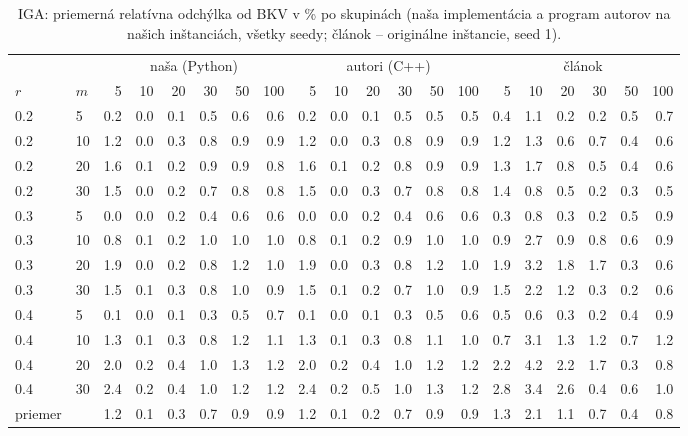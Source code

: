 \begin{table}[ht]
\centering
\scriptsize
\setlength{\tabcolsep}{3pt}
\caption{IGA: priemerná relatívna odchýlka od BKV v \% po skupinách (naša implementácia a program autorov na našich inštanciách, všetky seedy; článok – originálne inštancie, seed 1).}
\label{tab:rpd_iga}
\begin{tabular}{ll|rrrrrr|rrrrrr|rrrrrr}
\toprule
 &  & \multicolumn{6}{c}{naša (Python)} & \multicolumn{6}{c}{autori (C++)} & \multicolumn{6}{c}{článok} \\
$r$ & $m$ & 5 & 10 & 20 & 30 & 50 & 100 & 5 & 10 & 20 & 30 & 50 & 100 & 5 & 10 & 20 & 30 & 50 & 100 \\
\midrule
0.2 & 5 & 0.2 & 0.0 & 0.1 & 0.5 & 0.6 & 0.6 & 0.2 & 0.0 & 0.1 & 0.5 & 0.5 & 0.5 & 0.4 & 1.1 & 0.2 & 0.2 & 0.5 & 0.7 \\
0.2 & 10 & 1.2 & 0.0 & 0.3 & 0.8 & 0.9 & 0.9 & 1.2 & 0.0 & 0.3 & 0.8 & 0.9 & 0.9 & 1.2 & 1.3 & 0.6 & 0.7 & 0.4 & 0.6 \\
0.2 & 20 & 1.6 & 0.1 & 0.2 & 0.9 & 0.9 & 0.8 & 1.6 & 0.1 & 0.2 & 0.8 & 0.9 & 0.9 & 1.3 & 1.7 & 0.8 & 0.5 & 0.4 & 0.6 \\
0.2 & 30 & 1.5 & 0.0 & 0.2 & 0.7 & 0.8 & 0.8 & 1.5 & 0.0 & 0.3 & 0.7 & 0.8 & 0.8 & 1.4 & 0.8 & 0.5 & 0.2 & 0.3 & 0.5 \\
0.3 & 5 & 0.0 & 0.0 & 0.2 & 0.4 & 0.6 & 0.6 & 0.0 & 0.0 & 0.2 & 0.4 & 0.6 & 0.6 & 0.3 & 0.8 & 0.3 & 0.2 & 0.5 & 0.9 \\
0.3 & 10 & 0.8 & 0.1 & 0.2 & 1.0 & 1.0 & 1.0 & 0.8 & 0.1 & 0.2 & 0.9 & 1.0 & 1.0 & 0.9 & 2.7 & 0.9 & 0.8 & 0.6 & 0.9 \\
0.3 & 20 & 1.9 & 0.0 & 0.2 & 0.8 & 1.2 & 1.0 & 1.9 & 0.0 & 0.3 & 0.8 & 1.2 & 1.0 & 1.9 & 3.2 & 1.8 & 1.7 & 0.3 & 0.6 \\
0.3 & 30 & 1.5 & 0.1 & 0.3 & 0.8 & 1.0 & 0.9 & 1.5 & 0.1 & 0.2 & 0.7 & 1.0 & 0.9 & 1.5 & 2.2 & 1.2 & 0.3 & 0.2 & 0.6 \\
0.4 & 5 & 0.1 & 0.0 & 0.1 & 0.3 & 0.5 & 0.7 & 0.1 & 0.0 & 0.1 & 0.3 & 0.5 & 0.6 & 0.5 & 0.6 & 0.3 & 0.2 & 0.4 & 0.9 \\
0.4 & 10 & 1.3 & 0.1 & 0.3 & 0.8 & 1.2 & 1.1 & 1.3 & 0.1 & 0.3 & 0.8 & 1.1 & 1.0 & 0.7 & 3.1 & 1.3 & 1.2 & 0.7 & 1.2 \\
0.4 & 20 & 2.0 & 0.2 & 0.4 & 1.0 & 1.3 & 1.2 & 2.0 & 0.2 & 0.4 & 1.0 & 1.2 & 1.2 & 2.2 & 4.2 & 2.2 & 1.7 & 0.3 & 0.8 \\
0.4 & 30 & 2.4 & 0.2 & 0.4 & 1.0 & 1.2 & 1.2 & 2.4 & 0.2 & 0.5 & 1.0 & 1.3 & 1.2 & 2.8 & 3.4 & 2.6 & 0.4 & 0.6 & 1.0 \\
\midrule
priemer &  & 1.2 & 0.1 & 0.3 & 0.7 & 0.9 & 0.9 & 1.2 & 0.1 & 0.2 & 0.7 & 0.9 & 0.9 & 1.3 & 2.1 & 1.1 & 0.7 & 0.4 & 0.8 \\
\bottomrule
\end{tabular}
\end{table}
